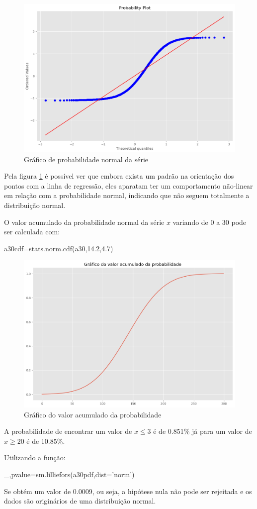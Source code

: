 \documentclass[12pt,a4paper,portuguese]{article}
\begin{document}
\begin{figure}[H]
	\centering
	\includegraphics[width=0.9\linewidth]{lista1-3.3d}
	\caption{Gráfico de probabilidade normal da série}
	\label{lista1-3.3d}
\end{figure}
Pela figura \ref{lista1-3.3d} é possível ver que embora exista um padrão na orientação dos pontos com a linha de regressão, eles aparatam ter um comportamento não-linear em relação com a probabilidade normal, indicando que não seguem totalmente a distribuição normal. 

O valor acumulado da probabilidade normal da série $x$ variando de 0 a 30 pode ser calculada com:
\begin{python}
	a30cdf=stats.norm.cdf(a30,14.2,4.7)
\end{python}
\begin{figure}[H]
	\centering
	\includegraphics[width=0.9\linewidth]{lista1-3.3f}
	\caption{Gráfico do valor acumulado da probabilidade}
	\label{fig:lista1-3.3f}
\end{figure}
A probabilidade de encontrar um valor de $x\leq 3$ é de 0.851\% já para um valor de $x\geq 20$ é de 10.85\%. 

Utilizando a função:
\begin{python}
_,pvalue=sm.lilliefors(a30pdf,dist='norm')
\end{python}
Se obtém um valor de 0.0009, ou seja, a hipótese nula não pode ser rejeitada e os dados são originários de uma distribuição normal.
\end{document}
